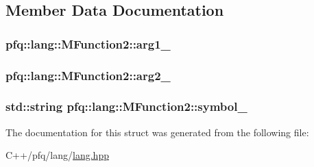 \subsection{Member Data Documentation}
\hypertarget{structpfq_1_1lang_1_1MFunction2_a0093c5b459cb597f34588894f5105e6b}{
\subsubsection[{arg1\+\_\+}]{ pfq\+::lang\+::\+M\+Function2\+::arg1\+\_\+}}\label{structpfq_1_1lang_1_1MFunction2_a0093c5b459cb597f34588894f5105e6b}
\hypertarget{structpfq_1_1lang_1_1MFunction2_a5f2a3278cdc59b6560ea02e7f9ead5ab}{
\subsubsection[{arg2\+\_\+}]{ pfq\+::lang\+::\+M\+Function2\+::arg2\+\_\+}}\label{structpfq_1_1lang_1_1MFunction2_a5f2a3278cdc59b6560ea02e7f9ead5ab}
\hypertarget{structpfq_1_1lang_1_1MFunction2_afdd71c7aed6b8f5f801bfd6c98f7274d}{
\subsubsection[{symbol\+\_\+}]{\setlength{\rightskip}{0pt plus 5cm}std\+::string pfq\+::lang\+::\+M\+Function2\+::symbol\+\_\+}}\label{structpfq_1_1lang_1_1MFunction2_afdd71c7aed6b8f5f801bfd6c98f7274d}


The documentation for this struct was generated from the following file\+:\begin{DoxyCompactItemize}
\item 
C++/pfq/lang/\hyperlink{lang_8hpp}{lang.\+hpp}\end{DoxyCompactItemize}

